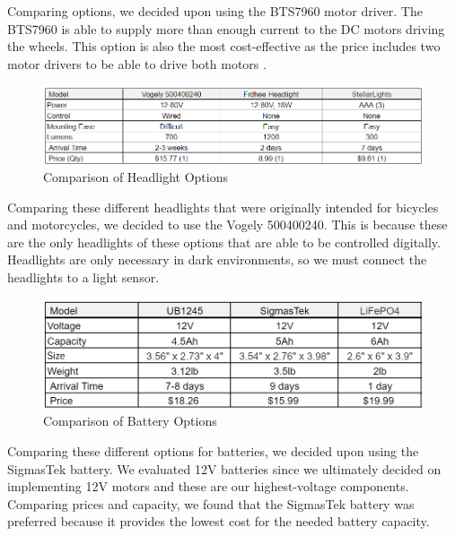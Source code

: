 \noindent Comparing options, we decided upon using the BTS7960 motor driver. The BTS7960 is able to supply more than enough current to the DC motors driving the wheels. This option is also the most cost-effective as the price includes two motor drivers to be able to drive both motors \cite{RioRand} \cite{Gikfun} \cite{Hobbywing}.\\

\begin{figure}[H]
	\centering
	\includegraphics[width=1\textwidth]{./Images/headlight_table.png}
	\caption{\label{fig:headlights}Comparison of Headlight Options}
\end{figure}

\noindent Comparing these different headlights that were originally intended for bicycles and motorcycles, we decided to use the Vogely ‎500400240. This is because these are the only headlights of these options that are able to be controlled digitally. Headlights are only necessary in dark environments, so we must connect the headlights to a light sensor. \cite{vogely2024} \cite{frdhee2024} \cite{stellarlights2024}\\

\begin{figure}[H]
	\centering
	\includegraphics[width=1\textwidth]{./Images/battery_table.png}
	\caption{\label{fig:batteries}Comparison of Battery Options}
\end{figure}

\noindent Comparing these different options for batteries, we decided upon using the SigmasTek battery. We evaluated 12V batteries since we ultimately decided on implementing 12V motors and these are our highest-voltage components. Comparing prices and capacity, we found that the SigmasTek battery was preferred because it provides the lowest cost for the needed battery capacity. \cite{liftmaster2024} \cite{lifepo42024}\\